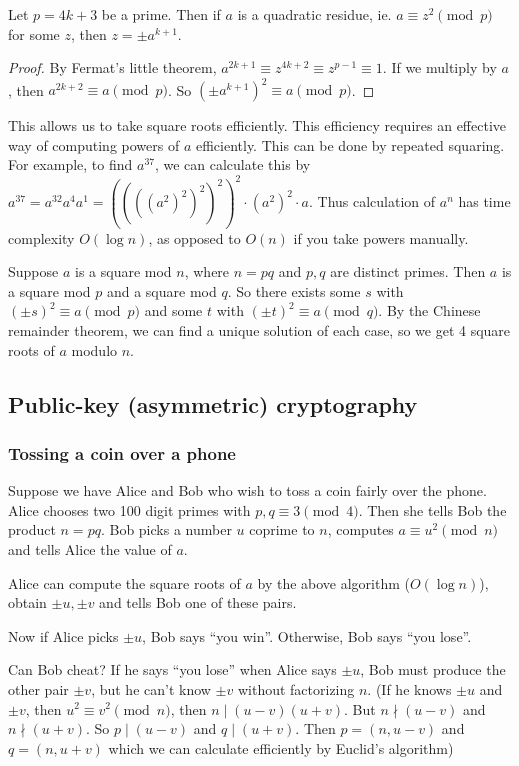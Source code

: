 \documentclass[a4paper]{article}
\begin{document}
\begin{prop}
  Let $p = 4k + 3$ be a prime. Then if $a$ is a quadratic residue, ie. $a \equiv z^2 \pmod p$ for some $z$, then $z = \pm a^{k + 1}$.
\end{prop}

\begin{proof}
  By Fermat's little theorem, $a^{2k + 1} \equiv z^{4k + 2} \equiv z^{p - 1} \equiv 1$. If we multiply by $a$, then $a^{2k + 2} \equiv a \pmod p$. So $(\pm a^{k + 1})^2 \equiv a \pmod p$.
\end{proof}
This allows us to take square roots efficiently. This efficiency requires an effective way of computing powers of $a$ efficiently. This can be done by repeated squaring. For example, to find $a^{37}$, we can calculate this by $a^{37} = a^{32}a^4a^1 = ((((a^2)^2)^2)^2)^2 \cdot (a^2)^2\cdot a$. Thus calculation of $a^n$ has time complexity $O(\log n)$, as opposed to $O(n)$ if you take powers manually.

Suppose $a$ is a square mod $n$, where $n = pq$ and $p, q$ are distinct primes. Then $a$ is a square mod $p$ and a square mod $q$. So there exists some $s$ with $(\pm s)^2 \equiv a\pmod p$ and some $t$ with $(\pm t)^2\equiv a\pmod q$. By the Chinese remainder theorem, we can find a unique solution of each case, so we get 4 square roots of $a$ modulo $n$.

\subsection{Public-key (asymmetric) cryptography}
\subsubsection*{Tossing a coin over a phone}
Suppose we have Alice and Bob who wish to toss a coin fairly over the phone. Alice chooses two 100 digit primes with $p, q\equiv 3\pmod 4$. Then she tells Bob the product $n = pq$. Bob picks a number $u$ coprime to $n$, computes $a\equiv u^2\pmod n$ and tells Alice the value of $a$.

Alice can compute the square roots of $a$ by the above algorithm ($O(\log n)$), obtain $\pm u, \pm v$ and tells Bob one of these pairs.

Now if Alice picks $\pm u$, Bob says ``you win''. Otherwise, Bob says ``you lose''.

Can Bob cheat? If he says ``you lose'' when Alice says $\pm u$, Bob must produce the other pair $\pm v$, but he can't know $\pm v$ without factorizing $n$. (If he knows $\pm u$ and $\pm v$, then $u^2 \equiv v^2\pmod n$, then $n \mid (u - v)(u + v)$. But $n\nmid (u - v)$ and $n\nmid (u + v)$. So $p \mid (u - v)$ and $q \mid (u + v)$. Then $p = (n, u - v)$ and $q = (n, u + v)$ which we can calculate efficiently by Euclid's algorithm)
\end{document}
